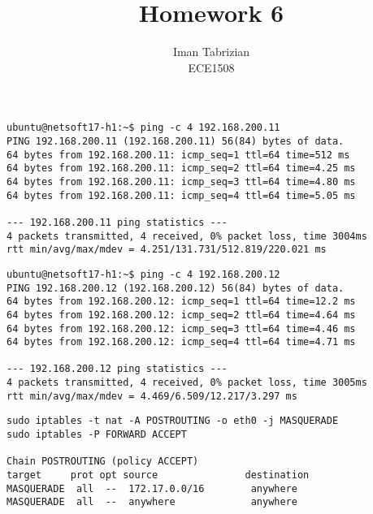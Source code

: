 \documentclass[12pt]{article}
\begin{document}
 
 
\title{Homework 6}
\author{Iman Tabrizian\\ %
ECE1508}

\maketitle

\begin{verbatim}
ubuntu@netsoft17-h1:~$ ping -c 4 192.168.200.11
PING 192.168.200.11 (192.168.200.11) 56(84) bytes of data.
64 bytes from 192.168.200.11: icmp_seq=1 ttl=64 time=512 ms
64 bytes from 192.168.200.11: icmp_seq=2 ttl=64 time=4.25 ms
64 bytes from 192.168.200.11: icmp_seq=3 ttl=64 time=4.80 ms
64 bytes from 192.168.200.11: icmp_seq=4 ttl=64 time=5.05 ms

--- 192.168.200.11 ping statistics ---
4 packets transmitted, 4 received, 0% packet loss, time 3004ms
rtt min/avg/max/mdev = 4.251/131.731/512.819/220.021 ms
\end{verbatim}

\begin{verbatim}
ubuntu@netsoft17-h1:~$ ping -c 4 192.168.200.12
PING 192.168.200.12 (192.168.200.12) 56(84) bytes of data.
64 bytes from 192.168.200.12: icmp_seq=1 ttl=64 time=12.2 ms
64 bytes from 192.168.200.12: icmp_seq=2 ttl=64 time=4.64 ms
64 bytes from 192.168.200.12: icmp_seq=3 ttl=64 time=4.46 ms
64 bytes from 192.168.200.12: icmp_seq=4 ttl=64 time=4.71 ms

--- 192.168.200.12 ping statistics ---
4 packets transmitted, 4 received, 0% packet loss, time 3005ms
rtt min/avg/max/mdev = 4.469/6.509/12.217/3.297 ms
\end{verbatim}

\begin{verbatim}
sudo iptables -t nat -A POSTROUTING -o eth0 -j MASQUERADE
sudo iptables -P FORWARD ACCEPT

Chain POSTROUTING (policy ACCEPT)
target     prot opt source               destination
MASQUERADE  all  --  172.17.0.0/16        anywhere
MASQUERADE  all  --  anywhere             anywhere
\end{verbatim}
\end{document}
